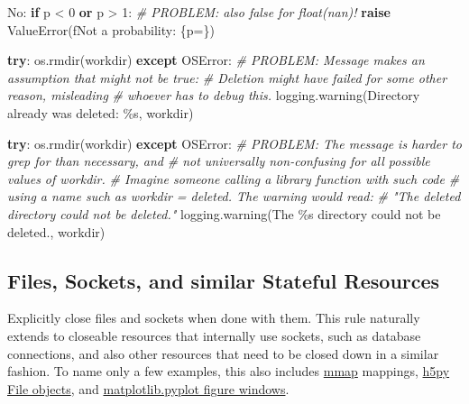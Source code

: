\documentclass[
]{article}
\newenvironment{Shaded}{}{}
\newcommand{\CommentTok}[1]{\textcolor[rgb]{0.38,0.63,0.69}{\textit{#1}}}
\newcommand{\ControlFlowTok}[1]{\textcolor[rgb]{0.00,0.44,0.13}{\textbf{#1}}}
\newcommand{\DecValTok}[1]{\textcolor[rgb]{0.25,0.63,0.44}{#1}}
\newcommand{\KeywordTok}[1]{\textcolor[rgb]{0.00,0.44,0.13}{\textbf{#1}}}
\newcommand{\NormalTok}[1]{#1}
\newcommand{\OperatorTok}[1]{\textcolor[rgb]{0.40,0.40,0.40}{#1}}
\newcommand{\PreprocessorTok}[1]{\textcolor[rgb]{0.74,0.48,0.00}{#1}}
\newcommand{\SpecialCharTok}[1]{\textcolor[rgb]{0.25,0.44,0.63}{#1}}
\newcommand{\SpecialStringTok}[1]{\textcolor[rgb]{0.73,0.40,0.53}{#1}}
\newcommand{\StringTok}[1]{\textcolor[rgb]{0.25,0.44,0.63}{#1}}
\begin{document}
\begin{samepage}
\begin{Shaded}
\begin{Highlighting}[]
\NormalTok{  No:}
  \ControlFlowTok{if}\NormalTok{ p }\OperatorTok{\textless{}} \DecValTok{0} \KeywordTok{or}\NormalTok{ p }\OperatorTok{\textgreater{}} \DecValTok{1}\NormalTok{:  }\CommentTok{\# PROBLEM: also false for float(\textquotesingle{}nan\textquotesingle{})!}
    \ControlFlowTok{raise} \PreprocessorTok{ValueError}\NormalTok{(}\SpecialStringTok{f\textquotesingle{}Not a probability: }\SpecialCharTok{\{}\NormalTok{p}\OperatorTok{=}\SpecialCharTok{\}}\SpecialStringTok{\textquotesingle{}}\NormalTok{)}

  \ControlFlowTok{try}\NormalTok{:}
\NormalTok{    os.rmdir(workdir)}
  \ControlFlowTok{except} \PreprocessorTok{OSError}\NormalTok{:}
    \CommentTok{\# PROBLEM: Message makes an assumption that might not be true:}
    \CommentTok{\# Deletion might have failed for some other reason, misleading}
    \CommentTok{\# whoever has to debug this.}
\NormalTok{    logging.warning(}\StringTok{\textquotesingle{}Directory already was deleted: }\SpecialCharTok{\%s}\StringTok{\textquotesingle{}}\NormalTok{, workdir)}

  \ControlFlowTok{try}\NormalTok{:}
\NormalTok{    os.rmdir(workdir)}
  \ControlFlowTok{except} \PreprocessorTok{OSError}\NormalTok{:}
    \CommentTok{\# PROBLEM: The message is harder to grep for than necessary, and}
    \CommentTok{\# not universally non{-}confusing for all possible values of \textasciigrave{}workdir\textasciigrave{}.}
    \CommentTok{\# Imagine someone calling a library function with such code}
    \CommentTok{\# using a name such as workdir = \textquotesingle{}deleted\textquotesingle{}. The warning would read:}
    \CommentTok{\# "The deleted directory could not be deleted."}
\NormalTok{    logging.warning(}\StringTok{\textquotesingle{}The }\SpecialCharTok{\%s}\StringTok{ directory could not be deleted.\textquotesingle{}}\NormalTok{, workdir)}
\end{Highlighting}
\end{Shaded}
\end{samepage}

\subsection{Files, Sockets, and similar Stateful Resources}

Explicitly close files and sockets when done with them. This rule
naturally extends to closeable resources that internally use sockets,
such as database connections, and also other resources that need to be
closed down in a similar fashion. To name only a few examples, this also
includes \href{https://docs.python.org/3/library/mmap.html}{mmap}
mappings, \href{https://docs.h5py.org/en/stable/high/file.html}{h5py
File objects}, and
\href{https://matplotlib.org/2.1.0/api/_as_gen/matplotlib.pyplot.close.html}{matplotlib.pyplot
figure windows}.
\end{document}
